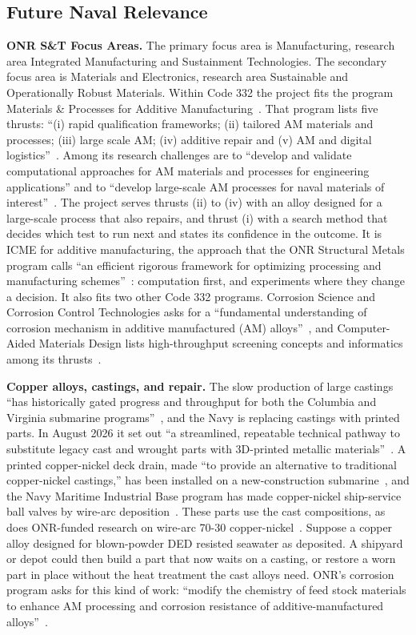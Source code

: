 \documentclass[12pt,letterpaper]{article}
\begin{document}
\subsection{Future Naval Relevance}
\label{sec:naval}

\textbf{ONR S\&T Focus Areas.} The primary focus area is Manufacturing,
research area Integrated Manufacturing and Sustainment Technologies. The
secondary focus area is Materials and Electronics, research area Sustainable
and Operationally Robust Materials. Within Code 332 the project fits the
program Materials \& Processes for Additive Manufacturing~\cite{onram}. That
program lists five thrusts: ``(i) rapid qualification frameworks; (ii)
tailored AM materials and processes; (iii) large scale AM; (iv) additive
repair and (v) AM and digital logistics''~\cite{onram}. Among its research
challenges are to ``develop and validate computational approaches for AM
materials and processes for engineering applications'' and to ``develop
large-scale AM processes for naval materials of interest''~\cite{onram}. The
project serves
thrusts (ii) to (iv) with an alloy designed for a large-scale process that
also repairs, and thrust (i) with a search method that decides which test to
run next and states its confidence in the outcome. It is ICME for additive
manufacturing, the approach that the ONR Structural Metals program calls ``an
efficient rigorous framework for optimizing processing and manufacturing
schemes''~\cite{onrsm}: computation first, and experiments where they change
a decision.
It also fits two other Code 332 programs.
Corrosion Science and Corrosion Control Technologies asks for a ``fundamental understanding of corrosion mechanism in additive manufactured (AM) alloys''~\cite{onrcorr}, and Computer-Aided Materials Design lists high-throughput screening concepts and informatics among its thrusts~\cite{onrcamd}.

\textbf{Copper alloys, castings, and repair.} The slow production of large
castings ``has historically gated progress and throughput for both the
Columbia and Virginia submarine programs''~\cite{navsup2026}, and the Navy is
replacing castings with printed parts. In August 2026 it set out ``a
streamlined, repeatable technical pathway to substitute legacy cast and
wrought parts with 3D-printed metallic materials''~\cite{navy2026ppd}. A
printed copper-nickel deck drain, made ``to provide an alternative to
traditional copper-nickel castings,'' has been installed on a
new-construction submarine~\cite{hii2023,nns2025}, and the Navy Maritime
Industrial Base program has made copper-nickel ship-service ball valves by
wire-arc deposition~\cite{dvids2025}. These parts use the cast compositions,
as does ONR-funded research on wire-arc 70-30 copper-nickel~\cite{song2024}.
Suppose a copper alloy designed for blown-powder DED resisted seawater as deposited.
A shipyard or depot could then build a part that now waits on a casting, or restore a worn part in place without the heat treatment the cast alloys need.
ONR's corrosion program asks for this kind of work: ``modify the
chemistry of feed stock materials to enhance AM processing and corrosion
resistance of additive-manufactured alloys''~\cite{onrcorr}.
\end{document}

